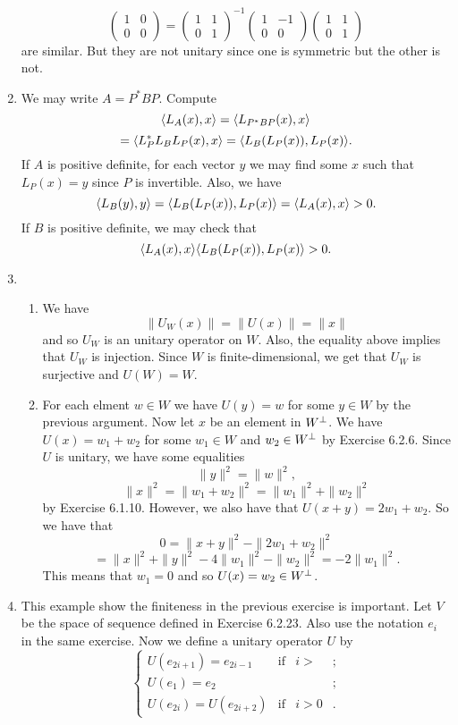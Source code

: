 \begin{enumerate}
\[\begin{pmatrix}1&0\\0&0\end{pmatrix}=\begin{pmatrix}1&1\\0&1\end{pmatrix}^{-1}\begin{pmatrix}1&-1\\0&0\end{pmatrix}\begin{pmatrix}1&1\\0&1\end{pmatrix}\]
are similar. But they are not unitary since one is symmetric but the other is not.
\item We may write $A=P^*BP$. Compute 
\[\langle L_A(x),x\rangle =\langle L_{P^*BP}(x),x\rangle \]
\[=\langle L_{P}^*L_BL_P(x),x\rangle =\langle L_B(L_P(x)),L_P(x)\rangle .\]
If $A$ is positive definite, for each vector $y$ we may find some $x$ such that $L_P(x)=y$ since $P$ is invertible. Also, we have 
\[\langle L_B(y),y\rangle =\langle L_B(L_P(x)),L_P(x)\rangle =\langle L_A(x),x\rangle >0.\]
If $B$ is positive definite, we may check that 
\[\langle L_A(x),x\rangle \langle L_B(L_P(x)),L_P(x)\rangle >0.\]
\item \begin{enumerate}
\item We have 
\[\|U_W(x)\|=\|U(x)\|=\|x\|\]
and so $U_W$ is an unitary operator on $W$. Also, the equality above implies that $U_W$ is injection. Since $W$ is finite-dimensional, we get that $U_W$ is surjective and $U(W)=W$.
\item For each elment $w\in W$ we have $U(y)=w$ for some $y\in W$ by the previous argument. Now let $x$ be an element in $W^{\perp}$. We have $U(x)=w_1+w_2$ for some $w_1\in W$ and $w_2\in W^{\perp}$ by Exercise 6.2.6. Since $U$ is unitary, we have some equalities 
\[\|y\|^2=\|w\|^2,\]
\[\|x\|^2=\|w_1+w_2\|^2=\|w_1\|^2+\|w_2\|^2\]
by Exercise 6.1.10. However, we also have that $U(x+y)=2w_1+w_2$. So we have that 
\[0=\|x+y\|^2-\|2w_1+w_2\|^2\]
\[=\|x\|^2+\|y\|^2-4\|w_1\|^2-\|w_2\|^2=-2\|w_1\|^2.\]
This means that $w_1=0$ and so $U(x)=w_2\in W^{\perp}$.
\end{enumerate}
\item This example show the finiteness in the previous exercise is important. Let $V$ be the space of sequence defined in Exercise 6.2.23. Also use the notation $e_i$ in the same exercise. Now we define a unitary operator $U$ by 
\[\left\{\begin{array}{llll}U(e_{2i+1})=e_{2i-1}&\mathrm{if} &i> &;\\U(e_1)=e_2&&&;\\U(e_{2i})=U(e_{2i+2})&\mathrm{if}&i>0&.\end{array}\right.\]

\end{enumerate}
